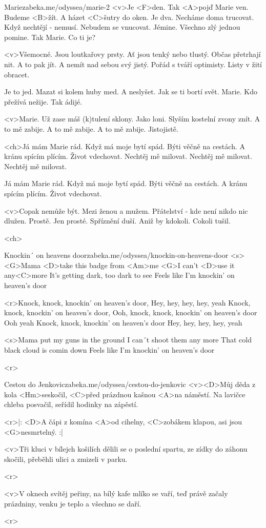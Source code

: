 \begin{song}{61}{Marie}{zabeka.me/odyssea/marie-2}
	<v>Je <F>den. Tak <A>pojď Marie ven.
	Budeme <B>žít. A házet <C>šutry do oken.
	Je dva. Necháme doma trucovat.
	Když nechtějí - nemusí. Nebudem se vnucovat.
	Jémine. Všechno zlý jednou pomine.
	Tak Marie. Co ti je?

	<v>Všemocné. Jsou loutkařovy prsty.
	Ať jsou tenký nebo tlustý. Občas přetrhají nit.
	A to pak jít. A nemít nad sebou svý jistý.
	Pořád s tváří optimisty. Listy v žití obracet.

	Je to jed. Mazat si kolem huby med.
	A neslyšet. Jak se ti bortí svět.
	Marie. Kdo přežívá nežije. Tak ádijé.

	<v>Marie. Už zase máš (k)tulení sklony.
	Jako loni. Slyším kostelní zvony znít.
	A to mě zabije. A to mě zabije.
	A to mě zabije. Jistojistě.

	<ch>Já mám Marie rád. Když má moje bytí spád.
	Býti věčně na cestách. A kránu spícím plícím.
	Život vdechovat. Nechtěj mě milovat.
	Nechtěj mě milovat. Nechtěj mě milovat.

	Já mám Marie rád. Když má moje bytí spád.
	Býti věčně na cestách. A kránu spícím plícím.
	Život vdechovat.

	<v>Copak nemůže být. Mezi ženou a mužem.
	Přátelství - kde není nikdo nic dlužen. Prostě.
	Jen prosté. Spříznění duší.
	Aniž by kdokoli. Cokoli tušil.

	<ch>

\end{song}
\begin{song}{62}{Knockin´ on heavens door}{zabeka.me/odyssea/knockin-on-heavens-door}
	<s><G>Mama <D>take this badge from <Am>me
	<G>I can't <D>use it any<C>more
	It's getting dark, too dark to see
	Feels like I'm knockin' on heaven's door

	<r>Knock, knock, knockin' on heaven's door,
	Hey, hey, hey, hey, yeah
	Knock, knock, knockin' on heaven's door,
	Ooh, knock, knock, knockin' on heaven's door
	Ooh yeah
	Knock, knock, knockin' on heaven's door
	Hey, hey, hey, hey, yeah

	<s>Mama put my guns in the ground
	I can´t shoot them any more
	That cold black cloud is comin down
	Feels like I'm knockin' on heaven's door

	<r>
\end{song}
\begin{song}[Radůza]{63}{Cestou do Jenkovic}{zabeka.me/odyssea/cestou-do-jenkovic}
	<v><D>Můj děda z kola <Hm>seskočil, <C>před prázdnou kašnou <A>na náměstí.
	Na lavičce chleba posvačil, seřídil hodinky na zápěstí.

	<r>|: <D>A čápi z komína <A>od cihelny, <C>zobákem klapou, asi jsou <G>nesmrtelný. :|

	<v>Tři kluci v bílejch košilích dělili se o poslední spartu,
	ze zídky do záhonu skočili, přeběhli ulici a zmizeli v parku.

	<r>

	<v>V oknech svítěj peřiny, na bílý kafe mlíko se vaří, teď právě začaly prázdniny, venku je teplo a všechno se daří.

	<r>
\end{song}
